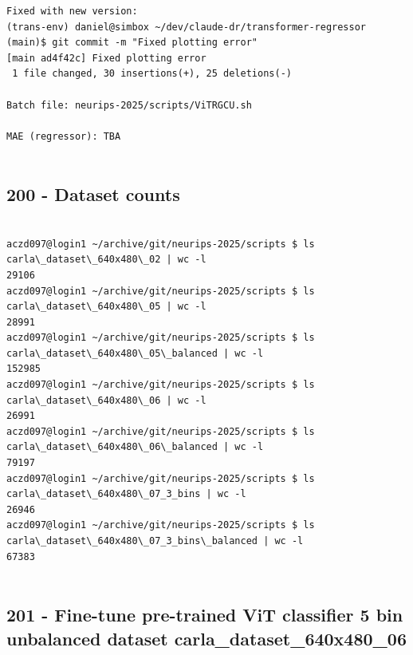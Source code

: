 \begin{verbatim}
Fixed with new version:
(trans-env) daniel@simbox ~/dev/claude-dr/transformer-regressor (main)$ git commit -m "Fixed plotting error"
[main ad4f42c] Fixed plotting error
 1 file changed, 30 insertions(+), 25 deletions(-)

Batch file: neurips-2025/scripts/ViTRGCU.sh

MAE (regressor): TBA


\end{verbatim}

\subsection{200 - Dataset counts}
\label{app_res:200}

\begin{verbatim}

aczd097@login1 ~/archive/git/neurips-2025/scripts $ ls carla\_dataset\_640x480\_02 | wc -l
29106
aczd097@login1 ~/archive/git/neurips-2025/scripts $ ls carla\_dataset\_640x480\_05 | wc -l
28991
aczd097@login1 ~/archive/git/neurips-2025/scripts $ ls carla\_dataset\_640x480\_05\_balanced | wc -l
152985
aczd097@login1 ~/archive/git/neurips-2025/scripts $ ls carla\_dataset\_640x480\_06 | wc -l
26991
aczd097@login1 ~/archive/git/neurips-2025/scripts $ ls carla\_dataset\_640x480\_06\_balanced | wc -l
79197
aczd097@login1 ~/archive/git/neurips-2025/scripts $ ls carla\_dataset\_640x480\_07_3_bins | wc -l
26946
aczd097@login1 ~/archive/git/neurips-2025/scripts $ ls carla\_dataset\_640x480\_07_3_bins\_balanced | wc -l
67383
    
\end{verbatim}

\subsection{201 - Fine-tune pre-trained ViT classifier 5 bin unbalanced dataset carla\_dataset\_640x480\_06}
\label{app_res:201}

